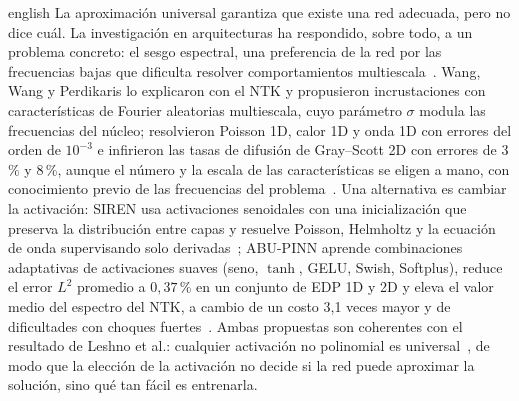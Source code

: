 \documentclass[../0000.tex]{subfiles}
\begin{document}
\begin{hyphenrules}{english}
La aproximación universal garantiza que existe una red adecuada, pero no dice cuál. La investigación en arquitecturas ha respondido, sobre todo, a un problema concreto: el sesgo espectral, una preferencia de la red por las frecuencias bajas que dificulta resolver comportamientos multiescala~\cite{cuomo2022}. Wang, Wang y Perdikaris lo explicaron con el NTK y propusieron incrustaciones con características de Fourier aleatorias multiescala, cuyo parámetro $\sigma$ modula las frecuencias del núcleo; resolvieron Poisson 1D, calor 1D y onda 1D con errores del orden de $10^{-3}$ e infirieron las tasas de difusión de Gray--Scott 2D con errores de $3$\,\% y $8$\,\%, aunque el número y la escala de las características se eligen a mano, con conocimiento previo de las frecuencias del problema~\cite{wang2021eigenvector}. Una alternativa es cambiar la activación: SIREN usa activaciones senoidales con una inicialización que preserva la distribución entre capas y resuelve Poisson, Helmholtz y la ecuación de onda supervisando solo derivadas~\cite{sitzmann2020}; ABU-PINN aprende combinaciones adaptativas de activaciones suaves (seno, $\tanh$, GELU, Swish, Softplus), reduce el error $L^2$ promedio a $0{,}37$\,\% en un conjunto de EDP 1D y 2D y eleva el valor medio del espectro del NTK, a cambio de un costo 3,1 veces mayor y de dificultades con choques fuertes~\cite{wang2023abu}. Ambas propuestas son coherentes con el resultado de Leshno et al.: cualquier activación no polinomial es universal~\cite{leshno1993}, de modo que la elección de la activación no decide si la red puede aproximar la solución, sino qué tan fácil es entrenarla.


\end{hyphenrules}
\end{document}
